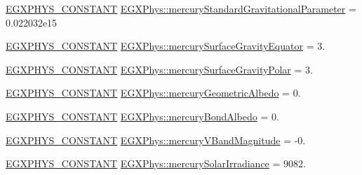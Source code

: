 \begin{DoxyCompactItemize}
\item 
\mbox{\hyperlink{group___e_g_x_phys-_constants-_macros_ga76980d288494ce1714c9ac68a95ba702}{E\+G\+X\+P\+H\+Y\+S\+\_\+\+C\+O\+N\+S\+T\+A\+NT}} \mbox{\hyperlink{group___e_g_x_phys-_constants-_astrophysics-_solar_system-_mercury-_bulk_ga55795db902bdf2ac1e4db46bab3e0edb}{E\+G\+X\+Phys\+::mercury\+Standard\+Gravitational\+Parameter}} = 0.\+022032e15
\item 
\mbox{\hyperlink{group___e_g_x_phys-_constants-_macros_ga76980d288494ce1714c9ac68a95ba702}{E\+G\+X\+P\+H\+Y\+S\+\_\+\+C\+O\+N\+S\+T\+A\+NT}} \mbox{\hyperlink{group___e_g_x_phys-_constants-_astrophysics-_solar_system-_mercury-_bulk_ga82c6a427ba4ba310574c522cff333693}{E\+G\+X\+Phys\+::mercury\+Surface\+Gravity\+Equator}} = 3.
\item 
\mbox{\hyperlink{group___e_g_x_phys-_constants-_macros_ga76980d288494ce1714c9ac68a95ba702}{E\+G\+X\+P\+H\+Y\+S\+\_\+\+C\+O\+N\+S\+T\+A\+NT}} \mbox{\hyperlink{group___e_g_x_phys-_constants-_astrophysics-_solar_system-_mercury-_bulk_ga7fdbe2d882ff39cc6151ed1c9afb93f7}{E\+G\+X\+Phys\+::mercury\+Surface\+Gravity\+Polar}} = 3.
\item 
\mbox{\hyperlink{group___e_g_x_phys-_constants-_macros_ga76980d288494ce1714c9ac68a95ba702}{E\+G\+X\+P\+H\+Y\+S\+\_\+\+C\+O\+N\+S\+T\+A\+NT}} \mbox{\hyperlink{group___e_g_x_phys-_constants-_astrophysics-_solar_system-_mercury-_bulk_ga98cc52c8bad157ae9ec6be798afb261c}{E\+G\+X\+Phys\+::mercury\+Geometric\+Albedo}} = 0.
\item 
\mbox{\hyperlink{group___e_g_x_phys-_constants-_macros_ga76980d288494ce1714c9ac68a95ba702}{E\+G\+X\+P\+H\+Y\+S\+\_\+\+C\+O\+N\+S\+T\+A\+NT}} \mbox{\hyperlink{group___e_g_x_phys-_constants-_astrophysics-_solar_system-_mercury-_bulk_ga2bc9c9b9a62a05dda96ee4fa281aad24}{E\+G\+X\+Phys\+::mercury\+Bond\+Albedo}} = 0.
\item 
\mbox{\hyperlink{group___e_g_x_phys-_constants-_macros_ga76980d288494ce1714c9ac68a95ba702}{E\+G\+X\+P\+H\+Y\+S\+\_\+\+C\+O\+N\+S\+T\+A\+NT}} \mbox{\hyperlink{group___e_g_x_phys-_constants-_astrophysics-_solar_system-_mercury-_bulk_gab4b0edd36ba34de13b19370f854a8f2c}{E\+G\+X\+Phys\+::mercury\+V\+Band\+Magnitude}} = -\/0.
\item 
\mbox{\hyperlink{group___e_g_x_phys-_constants-_macros_ga76980d288494ce1714c9ac68a95ba702}{E\+G\+X\+P\+H\+Y\+S\+\_\+\+C\+O\+N\+S\+T\+A\+NT}} \mbox{\hyperlink{group___e_g_x_phys-_constants-_astrophysics-_solar_system-_mercury-_bulk_ga36990b1744cb8a5cfaaf68771dde41fd}{E\+G\+X\+Phys\+::mercury\+Solar\+Irradiance}} = 9082.

\end{DoxyCompactItemize}
